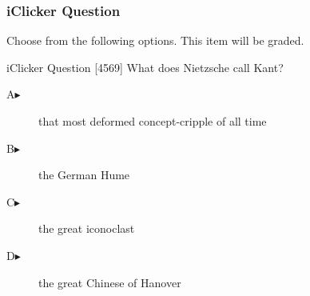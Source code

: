 \begin{frame}
  \frametitle{iClicker Question}
Choose from the following options. This item will be graded.
\begin{block}{iClicker Question}
[4569] What does Nietzsche call Kant?
\end{block}
\begin{description}
\item[A\hspace{.2in}$\blacktriangleright$] that most deformed concept-cripple of all time
\item[B\hspace{.2in}$\blacktriangleright$] the German Hume
\item[C\hspace{.2in}$\blacktriangleright$] the great iconoclast
\item[D\hspace{.2in}$\blacktriangleright$] the great Chinese of Hanover
\end{description}
\end{frame}
